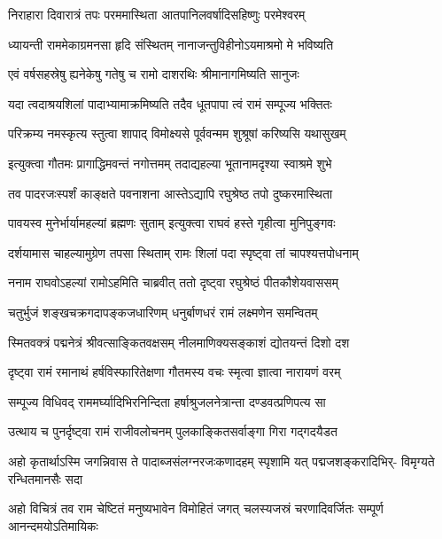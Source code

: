 \twolineshloka
{निराहारा दिवारात्रं तपः परममास्थिता}
{आतपानिलवर्षादिसहिष्णुः परमेश्वरम्} %

\twolineshloka
{ध्यायन्ती राममेकाग्रमनसा हृदि संस्थितम्}
{नानाजन्तुविहीनोऽयमाश्रमो मे भविष्यति} %

\twolineshloka
{एवं वर्षसहस्रेषु ह्यनेकेषु गतेषु च}
{रामो दाशरथिः श्रीमानागमिष्यति सानुजः} %

\twolineshloka
{यदा त्वदाश्रयशिलां पादाभ्यामाक्रमिष्यति}
{तदैव धूतपापा त्वं रामं सम्पूज्य भक्तितः} %

\twolineshloka
{परिक्रम्य नमस्कृत्य स्तुत्वा शापाद् विमोक्ष्यसे}
{पूर्ववन्मम शुश्रूषां करिष्यसि यथासुखम्} %

\twolineshloka
{इत्युक्त्वा गौतमः प्रागाद्धिमवन्तं नगोत्तमम्}
{तदाद्यहल्या भूतानामदृश्या स्वाश्रमे शुभे} %

\twolineshloka
{तव पादरजःस्पर्शं काङ्क्षते पवनाशना}
{आस्तेऽद्यापि रघुश्रेष्ठ तपो दुष्करमास्थिता} %

\twolineshloka
{पावयस्व मुनेर्भार्यामहल्यां ब्रह्मणः सुताम्}
{इत्युक्त्वा राघवं हस्ते गृहीत्वा मुनिपुङ्गवः} %

\twolineshloka
{दर्शयामास चाहल्यामुग्रेण तपसा स्थिताम्}
{रामः शिलां पदा स्पृष्ट्वा तां चापश्यत्तपोधनाम्} %

\twolineshloka
{ननाम राघवोऽहल्यां रामोऽहमिति चाब्रवीत्}
{ततो दृष्ट्वा रघुश्रेष्ठं पीतकौशेयवाससम्} %

\twolineshloka
{चतुर्भुजं शङ्खचक्रगदापङ्कजधारिणम्}
{धनुर्बाणधरं रामं लक्ष्मणेन समन्वितम्} %

\twolineshloka
{स्मितवक्त्रं पद्मनेत्रं श्रीवत्साङ्कितवक्षसम्}
{नीलमाणिक्यसङ्काशं द्योतयन्तं दिशो दश} %

\twolineshloka
{दृष्ट्वा रामं रमानाथं हर्षविस्फारितेक्षणा}
{गौतमस्य वचः स्मृत्वा ज्ञात्वा नारायणं वरम्} %

\twolineshloka
{सम्पूज्य विधिवद् राममर्घ्यादिभिरनिन्दिता}
{हर्षाश्रुजलनेत्रान्ता दण्डवत्प्रणिपत्य सा} %

\twolineshloka
{उत्थाय च पुनर्दृष्ट्वा रामं राजीवलोचनम्}
{पुलकाङ्कितसर्वाङ्गा गिरा गद्गदयैडत} %


\fourlineindentedshloka
{अहो कृतार्थाऽस्मि जगन्निवास ते}
{पादाब्जसंलग्नरजःकणादहम्}
{स्पृशामि यत् पद्मजशङ्करादिभिर्-}
{विमृग्यते रन्धितमानसैः सदा} %

\fourlineindentedshloka
{अहो विचित्रं तव राम चेष्टितं}
{मनुष्यभावेन विमोहितं जगत्}
{चलस्यजस्रं चरणादिवर्जितः}
{सम्पूर्ण आनन्दमयोऽतिमायिकः} %

